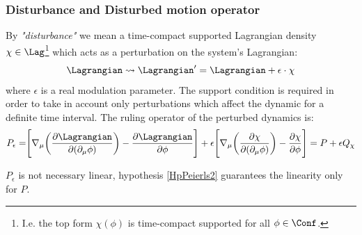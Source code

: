 \documentclass[Main]{subfiles}
\begin{document}
	\subsubsection{Disturbance and Disturbed motion operator }
		By \emph{"disturbance"} we mean a time-compact supported Lagrangian density $\chi \in \Lag$\footnote{I.e. the top form $\chi(\phi)$ is time-compact supported for all $\phi \in \Conf$.} which acts as a perturbation on the system's Lagrangian:
		\begin{displaymath}
			\Lagrangian \rightsquigarrow \Lagrangian' = \Lagrangian + \epsilon\cdot \chi
		\end{displaymath}
		where $\epsilon$  is a real modulation parameter.
		The support condition is required in order to take in account only perturbations which affect the dynamic for a definite time interval.
		The ruling operator of the perturbed dynamics is:
		\begin{equation}
			P_\epsilon = \Biggr[ \nabla_\mu \biggr( \frac{\partial \Lagrangian}{\partial(\partial_\mu \phi)} \biggr) - \frac{\partial \Lagrangian}{\partial \phi} \Biggr] + \epsilon \Biggr[ \nabla_\mu \biggr( \frac{\partial \chi}{\partial(\partial_\mu \phi)} \biggr) - \frac{\partial \chi}{\partial \phi} \Biggr]
			= P + \epsilon Q_\chi		
		\end{equation}
		\begin{observation}
			$P_\epsilon$ is not necessary linear, hypothesis \ref{HpPeierls2} guarantees the linearity only for $P$.
		\end{observation}
\end{document}
